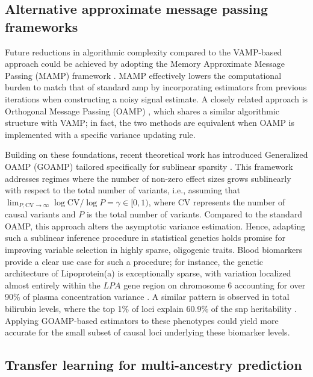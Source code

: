\subsection{Alternative approximate message passing frameworks}

Future reductions in algorithmic complexity compared to the VAMP-based approach could be achieved by adopting the Memory Approximate Message Passing (MAMP) framework \cite{MAMP}. MAMP effectively lowers the computational burden to match that of standard \gls{amp} by incorporating estimators from previous iterations when constructing a noisy signal estimate. A closely related approach is Orthogonal Message Passing (OAMP) \cite{OAMP}, which shares a similar algorithmic structure with VAMP; in fact, the two methods are equivalent when OAMP is implemented with a specific variance updating rule.

Building on these foundations, recent theoretical work has introduced Generalized OAMP (GOAMP) tailored specifically for sublinear sparsity \cite{takeuchi2025generalized}. This framework addresses regimes where the number of non-zero effect sizes grows sublinearly with respect to the total number of variants, i.e., assuming that $\lim_{P, \text{CV} \to \infty} \log \text{CV} / \log P = \gamma \in [0, 1)$, where $\text{CV}$ represents the number of causal variants and $P$ is the total number of variants. Compared to the standard OAMP, this approach alters the asymptotic variance estimation. Hence, adapting such a sublinear inference procedure in statistical genetics holds promise for improving variable selection in highly sparse, oligogenic traits. Blood biomarkers provide a clear use case for such a procedure; for instance, the genetic architecture of Lipoprotein(a) is exceptionally sparse, with variation localized almost entirely within the $LPA$ gene region on chromosome 6 accounting for over 90\% of plasma concentration variance \cite{Boerwinkle,Clarke}. A similar pattern is observed in total bilirubin levels, where the top 1\% of loci explain 60.9\% of the \gls{snp} heritability \cite{35blood_biomarkers}. Applying GOAMP-based estimators to these phenotypes could yield more accurate  for the small subset of causal loci underlying these biomarker levels.

\subsection{Transfer learning for multi-ancestry prediction}

